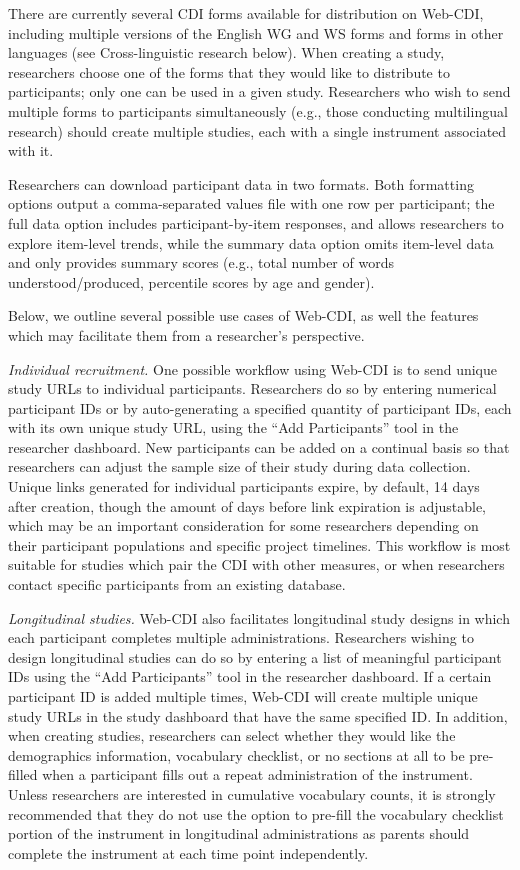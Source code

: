 \documentclass[
  english,
  ,man,floatsintext]{apa6}
\begin{document}
There are currently several CDI forms available for distribution on Web-CDI, including multiple versions of the English WG and WS forms and forms in other languages (see Cross-linguistic research below). When creating a study, researchers choose one of the forms that they would like to distribute to participants; only one can be used in a given study. Researchers who wish to send multiple forms to participants simultaneously (e.g., those conducting multilingual research) should create multiple studies, each with a single instrument associated with it.

Researchers can download participant data in two formats. Both formatting options output a comma-separated values file with one row per participant; the full data option includes participant-by-item responses, and allows researchers to explore item-level trends, while the summary data option omits item-level data and only provides summary scores (e.g., total number of words understood/produced, percentile scores by age and gender).

Below, we outline several possible use cases of Web-CDI, as well the features which may facilitate them from a researcher's perspective.

\emph{Individual recruitment.} One possible workflow using Web-CDI is to send unique study URLs to individual participants. Researchers do so by entering numerical participant IDs or by auto-generating a specified quantity of participant IDs, each with its own unique study URL, using the \enquote{Add Participants} tool in the researcher dashboard. New participants can be added on a continual basis so that researchers can adjust the sample size of their study during data collection. Unique links generated for individual participants expire, by default, 14 days after creation, though the amount of days before link expiration is adjustable, which may be an important consideration for some researchers depending on their participant populations and specific project timelines. This workflow is most suitable for studies which pair the CDI with other measures, or when researchers contact specific participants from an existing database.

\emph{Longitudinal studies.} Web-CDI also facilitates longitudinal study designs in which each participant completes multiple administrations. Researchers wishing to design longitudinal studies can do so by entering a list of meaningful participant IDs using the \enquote{Add Participants} tool in the researcher dashboard. If a certain participant ID is added multiple times, Web-CDI will create multiple unique study URLs in the study dashboard that have the same specified ID. In addition, when creating studies, researchers can select whether they would like the demographics information, vocabulary checklist, or no sections at all to be pre-filled when a participant fills out a repeat administration of the instrument. Unless researchers are interested in cumulative vocabulary counts, it is strongly recommended that they do not use the option to pre-fill the vocabulary checklist portion of the instrument in longitudinal administrations as parents should complete the instrument at each time point independently.
\end{document}
